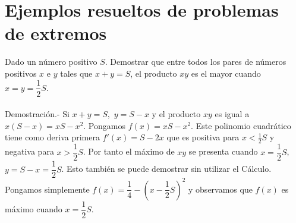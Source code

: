 \begin{comment}
    \item $f(x)=\dfrac{1}{6}x^2+\dfrac{1}{12}\cos 2x$.\\\\
	Respuesta.-\;
	\begin{enumerate}
	    \item Derivando $f(x)$, tenemos 
		$$f'(x)=\dfrac{1}{3}x-\dfrac{1}{6}\sen(2x).$$
	    Luego igualando a $0$,
	    $$\dfrac{1}{3}x-\dfrac{1}{6}\sen(2x)=0\quad \Rightarrow \quad x=0.$$
	    \item $f$ es creciente si $x>0$ y decreciente si $x<0.$
	    \item Sea $f''(x)=\dfrac{1}{3}-\dfrac{1}{2}\cos(2x)$. Entonces, $f'$ es creciente para todo $x$.
	    \item \;
	    \begin{center}
		\begin{tikzpicture}
		\begin{axis}[scale=.5,draw opacity =.5,samples=100,smooth, 
		  axis x line=center, 
		  axis y line=center,
		  ylabel = {$f(x)$},
		  xlabel = {$x$},
		  xlabel style={below right},
		  ylabel style={above left},
		  xmin=-4,xmax=4,ymin=-.1,ymax=2,
		  label style={font=\tiny},
		  tick label style={font=\tiny},
		  enlargelimits=upper] 
		  \addplot[black,opacity=1]{1/6*x^2+1/12*cos(2*deg(x))};
		\end{axis}
	    \end{tikzpicture}
	    \end{center}
	    \vspace{.5cm}
	\end{enumerate}

\end{enumerate}


\end{comment}

\section{Ejemplos resueltos de problemas de extremos}

\begin{ejem}
    Dado un número positivo $S$. Demostrar que entre todos los pares de números positivos $x$ e $y$ tales que $x+y=S$, el producto $xy$ es el mayor cuando $x=y=\dfrac{1}{2}S.$\\\\
	Demostración.-\; Si $x+y=S,$ $y=S-x$ y el producto $xy$ es igual a $x(S-x)=xS-x^2$. Pongamos $f(x)=xS-x^2$. Este polinomio cuadrático tiene como deriva primera $f'(x)=S-2x$ que es positiva para $x<\frac{1}{2}S$ y negativa para $x>\dfrac{1}{2}S$. Por tanto el máximo de $xy$ se presenta cuando $x=\dfrac{1}{2}S$, $y=S-x=\dfrac{1}{2}S$. Esto también se puede demostrar sin utilizar el Cálculo. Pongamos simplemente $f(x)=\dfrac{1}{4}-\left(x-\dfrac{1}{2}S\right)^2$ y observamos que $f(x)$ es máximo cuando $x=\dfrac{1}{2}S$.\\
\end{ejem}

